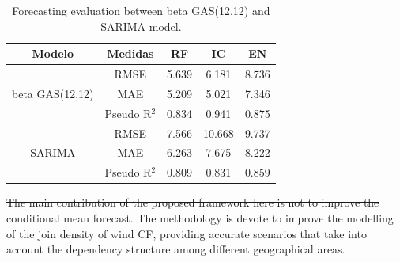 \documentclass[a4paper]{IEEEtran}
\providecommand{\DIFdel}[1]{{\protect\color{red}\sout{#1}}}                      %
\providecommand{\DIFdelbegin}{} %
\begin{document}
\begin{table}[htbp]
\centering
\caption{Forecasting evaluation between beta GAS(12,12) and SARIMA model.}
\begin{tabular}{c|cccc}
\hline
Modelo                 & Medidas        & RF    & IC     & EN     \\ \hline
                       & RMSE           & 5.639 & 6.181  & 8.736  \\
beta GAS(12,12)        & MAE            & 5.209 & 5.021  & 7.346  \\
                       & Pseudo R$^{2}$ & 0.834 & 0.941  & 0.875  \\ \hline
                       & RMSE           & 7.566 & 10.668 & 9.737  \\
SARIMA                 & MAE            & 6.263 & 7.675  & 8.222  \\
                       & Pseudo R$^{2}$ & 0.809 & 0.831  & 0.859  \\ \hline
\end{tabular}
\label{tablefor}
\end{table}

\DIFdelbegin \DIFdel{The main contribution of the proposed framework here is not to improve the conditional mean forecast. The methodology is devote to improve the modelling of the join density of wind CF, providing accurate scenarios that take into account the dependency structure among different geographical areas.
}%
\end{document}
